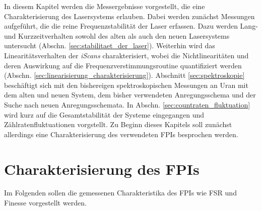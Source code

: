 In diesem Kapitel werden die Messergebnisse vorgestellt, die eine
Charakterisierung des Lasersystems erlauben. Dabei werden zunächst Messungen
aufgeführt, die die reine Frequenzstabilität der Laser erfassen. Dazu werden
Lang- und Kurzzeitverhalten sowohl des alten als auch den neuen Lasersystems
untersucht (Abschn. \ref{sec:stabilitaet_der_laser}). Weiterhin wird das
Linearitätsverhalten der \textit{iScans} charakterisiert, wobei die
Nichtlinearitäten und deren Auswirkung auf die
Frequenzverstimmungsroutine quantifiziert werden (Abschn.
\ref{sec:linearisierung_charakterisierung}). Abschnitt \ref{sec:spektroskopie} beschäftigt
sich mit den bishereigen spektroskopischen Messungen an Uran mit dem alten und
neuen System, dem bisher verwendeten Anregungsschema und der Suche nach neuen
Anregungsschemata. In Abschn. \ref{sec:countraten_fluktuation} wird kurz auf die
Gesamtstabilität der Systeme eingegangen und Zählratenfluktuationen vorgstellt.
Zu Beginn dieses Kapitels soll zunächst allerdings eine Charakterisierung
des verwendeten FPIs besprochen werden.

\section{Charakterisierung des FPIs}\label{sec:charakterisierung_FPI}
Im Folgenden sollen die gemessenen Charakteristika des FPIs wie FSR und Finesse
vorgestellt werden.

